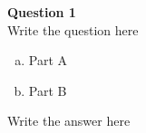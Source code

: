 \documentclass[11pt]{article}
\newcommand{\question}[2]{\begin{framed}\noindent \textbf{Question #1}\\ #2\end{framed}}
\begin{document}
\question{1}{
  Write the question here
  \vspace{-3mm}\begin{enumerate}[(a)]\setlength{\itemsep}{0pt}\setlength{\parskip}{0pt}
  \item Part A
  \item Part B
  \end{enumerate}\vspace{-3mm}
}
Write the answer here

\end{document}
